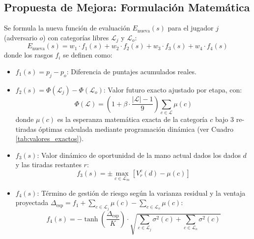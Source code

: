 \documentclass[10pt, a4paper]{article}
\begin{document}
\subsection{Propuesta de Mejora: Formulación Matemática}
Se formula la nueva función de evaluación $E_{\text{nueva}}(s)$ para el jugador $j$ (adversario $o$) con categorías libres $\mathcal{L}_j$ y $\mathcal{L}_o$:
\begin{equation}
E_{\text{nueva}}(s) = w_1 \cdot f_1(s) + w_2 \cdot f_2(s) + w_3 \cdot f_3(s) + w_4 \cdot f_4(s)
\label{eq:nueva_cacho}
\end{equation}
donde los rasgos $f_i$ se definen como:
\begin{itemize}
    \item $f_1(s) = p_j - p_o$: Diferencia de puntajes acumulados reales.
    \item $f_2(s) = \Phi(\mathcal{L}_j) - \Phi(\mathcal{L}_o)$: Valor futuro exacto ajustado por etapa, con:
    \begin{equation}
    \Phi(\mathcal{L}) = \left( 1 + \beta \cdot \frac{|\mathcal{L}| - 1}{9} \right) \sum_{c \in \mathcal{L}} \mu(c)
    \end{equation}
    donde $\mu(c)$ es la esperanza matemática exacta de la categoría $c$ bajo 3 re-tiradas óptimas calculada mediante programación dinámica (ver Cuadro \ref{tab:valores_exactos}).
    \item $f_3(s)$: Valor dinámico de oportunidad de la mano actual dados los dados $d$ y las tiradas restantes $r$:
    \begin{equation}
    f_3(s) = \pm \max_{c \in \mathcal{L}_m} \left[ V_r^c(d) - \mu(c) \right]
    \end{equation}
    \item $f_4(s)$: Término de gestión de riesgo según la varianza residual y la ventaja proyectada $\Delta_{\text{esp}} = f_1 + \sum_{c \in \mathcal{L}_j} \mu(c) - \sum_{c \in \mathcal{L}_o} \mu(c)$:
    \begin{equation}
    f_4(s) = -\tanh\left( \frac{\Delta_{\text{esp}}}{K} \right) \cdot \sqrt{\sum_{c \in \mathcal{L}_j} \sigma^2(c) + \sum_{c \in \mathcal{L}_o} \sigma^2(c)}
    \end{equation}
\end{itemize}
\end{document}
